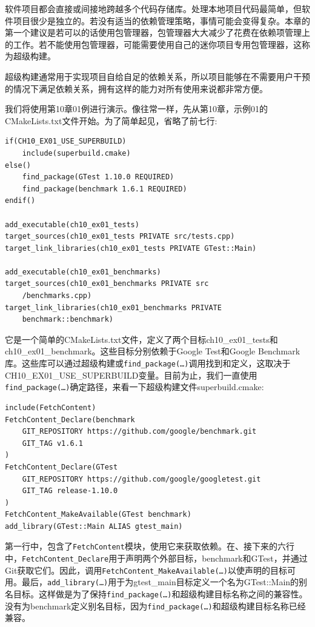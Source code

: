 
软件项目都会直接或间接地跨越多个代码存储库。处理本地项目代码最简单，但软件项目很少是独立的。若没有适当的依赖管理策略，事情可能会变得复杂。本章的第一个建议是若可以的话使用包管理器，包管理器大大减少了花费在依赖项管理上的工作。若不能使用包管理器，可能需要使用自己的迷你项目专用包管理器，这称为超级构建。

超级构建通常用于实现项目自给自足的依赖关系，所以项目能够在不需要用户干预的情况下满足依赖关系，拥有这样的能力对所有使用来说都非常方便。


我们将使用第10章01例进行演示。像往常一样，先从第10章，示例01的CMakeLists.txt文件开始。为了简单起见，省略了前七行:

\begin{lstlisting}[style=styleCMake]
if(CH10_EX01_USE_SUPERBUILD)
	include(superbuild.cmake)
else()
	find_package(GTest 1.10.0 REQUIRED)
	find_package(benchmark 1.6.1 REQUIRED)
endif()

add_executable(ch10_ex01_tests)
target_sources(ch10_ex01_tests PRIVATE src/tests.cpp)
target_link_libraries(ch10_ex01_tests PRIVATE GTest::Main)

add_executable(ch10_ex01_benchmarks)
target_sources(ch10_ex01_benchmarks PRIVATE src
	/benchmarks.cpp)
target_link_libraries(ch10_ex01_benchmarks PRIVATE
	benchmark::benchmark)
\end{lstlisting}

它是一个简单的CMakeLists.txt文件，定义了两个目标ch10\_ex01\_tests和ch10\_ex01\_benchmark。这些目标分别依赖于Google Test和Google Benchmark库。这些库可以通过超级构建或\texttt{find\_package(…)}调用找到和定义，这取决于CH10\_EX01\_USE\_SUPERBUILD变量。目前为止，我们一直使用\texttt{find\_package(…)}确定路径，来看一下超级构建文件superbuild.cmake:

\begin{lstlisting}[style=styleCMake]
include(FetchContent)
FetchContent_Declare(benchmark
	GIT_REPOSITORY https://github.com/google/benchmark.git
	GIT_TAG v1.6.1
)
FetchContent_Declare(GTest
	GIT_REPOSITORY https://github.com/google/googletest.git
	GIT_TAG release-1.10.0
)
FetchContent_MakeAvailable(GTest benchmark)
add_library(GTest::Main ALIAS gtest_main)
\end{lstlisting}

第一行中，包含了\texttt{FetchContent}模块，使用它来获取依赖。在、接下来的六行中，\texttt{FetchContent\_Declare}用于声明两个外部目标，benchmark和GTest，并通过Git获取它们。因此，调用\texttt{FetchContent\_MakeAvailable(…)}以使声明的目标可用。最后，\texttt{add\_library(…)}用于为gtest\_main目标定义一个名为GTest::Main的别名目标。这样做是为了保持\texttt{find\_package(…)}和超级构建目标名称之间的兼容性。没有为benchmark定义别名目标，因为\texttt{find\_package(…)}和超级构建目标名称已经兼容。

